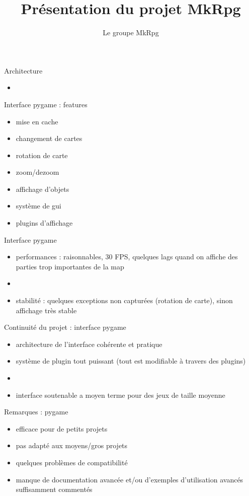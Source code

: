 \documentclass[11pt]{beamer}
\author{Le groupe MkRpg}
\title{Présentation du projet MkRpg}
\begin{document}
\begin{frame}{Architecture}
	\begin{itemize}
		\item 
	\end{itemize}
\end{frame}

\begin{frame}{Interface pygame : features}
	\begin{itemize}
		\item mise en cache
    \item changement de cartes
    \item rotation de carte
    \item zoom/dezoom
    \item affichage d'objets
    \item système de gui
    \item plugins d'affichage
	\end{itemize}
\end{frame}

\begin{frame}{Interface pygame}
	\begin{itemize}
    \item performances : raisonnables, 30 FPS, quelques lags quand on affiche des parties trop importantes de la map
		\item[]
    \item stabilité : quelques exceptions non capturées (rotation de carte), sinon affichage très stable
	\end{itemize}
\end{frame}

\begin{frame}{Continuité du projet : interface pygame}
	\begin{itemize}
		\item architecture de l'interface cohérente et pratique
		\item système de plugin tout puissant (tout est modifiable à travers des plugins)
		\item[]
		\item interface soutenable a moyen terme pour des jeux de taille moyenne
	\end{itemize}
\end{frame}

\begin{frame}{Remarques : pygame}
	\begin{itemize}
		\item efficace pour de petits projets
		\item pas adapté aux moyens/gros projets
		\item quelques problèmes de compatibilité
		\item manque de documentation avancée et/ou d'exemples d'utilisation avancés suffisamment commentés
	\end{itemize}
\end{frame}
\end{document}
